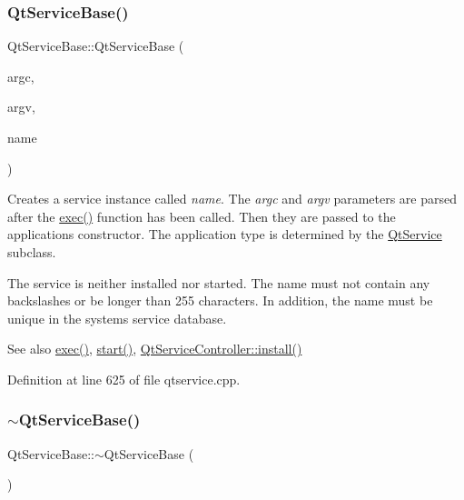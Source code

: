 \subsubsection{\texorpdfstring{Qt\+Service\+Base()}{QtServiceBase()}}
{\footnotesize\ttfamily Qt\+Service\+Base\+::\+Qt\+Service\+Base (\begin{DoxyParamCaption}\item[{int}]{argc,  }\item[{char $\ast$$\ast$}]{argv,  }\item[{const Q\+String \&}]{name }\end{DoxyParamCaption})}

Creates a service instance called {\itshape name}. The {\itshape argc} and {\itshape argv} parameters are parsed after the \mbox{\hyperlink{class_qt_service_base_afae2e589de71c1ae3ae8db3dc9ab9c64}{exec()}} function has been called. Then they are passed to the application\textquotesingle{}s constructor. The application type is determined by the \mbox{\hyperlink{class_qt_service}{Qt\+Service}} subclass.

The service is neither installed nor started. The name must not contain any backslashes or be longer than 255 characters. In addition, the name must be unique in the system\textquotesingle{}s service database.

\begin{DoxySeeAlso}{See also}
\mbox{\hyperlink{class_qt_service_base_afae2e589de71c1ae3ae8db3dc9ab9c64}{exec()}}, \mbox{\hyperlink{class_qt_service_base_adbc0cd621b41bd3a6a1f62fda432e9e4}{start()}}, \mbox{\hyperlink{class_qt_service_controller_a7e2b85e911ff152557dd25959e76094b}{Qt\+Service\+Controller\+::install()}} 
\end{DoxySeeAlso}


Definition at line 625 of file qtservice.\+cpp.

\mbox{\label{class_qt_service_base_a82c0872e5ed2448eff9eb6521f75bfd2}} 
\subsubsection{\texorpdfstring{$\sim$\+Qt\+Service\+Base()}{~QtServiceBase()}}
{\footnotesize\ttfamily Qt\+Service\+Base\+::$\sim$\+Qt\+Service\+Base (\begin{DoxyParamCaption}{ }\end{DoxyParamCaption})\hspace{0.3cm}{\ttfamily [virtual]}}

